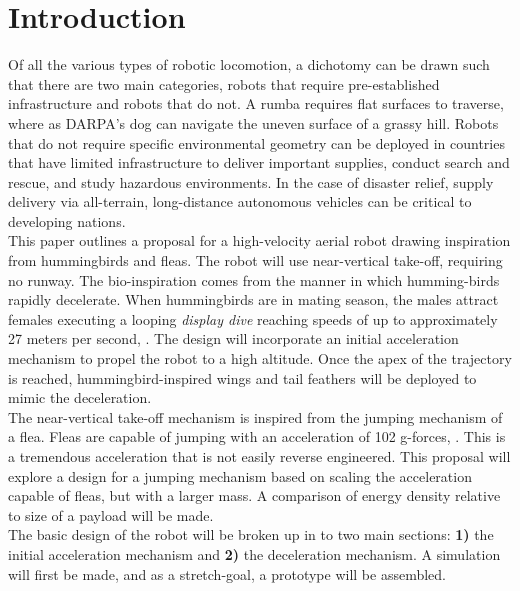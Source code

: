 \section{Introduction}
\label{intro}

\indent Of all the various types of robotic locomotion, a dichotomy can be drawn such that there are two main categories, robots that require pre-established infrastructure and robots that do not. A rumba requires flat surfaces to traverse, where as DARPA's dog can navigate the uneven surface of a grassy hill. Robots that do not require specific environmental geometry can be deployed in countries that have limited infrastructure to deliver important supplies, conduct search and rescue, and study hazardous environments. In the case of disaster relief, supply delivery via all-terrain, long-distance autonomous vehicles can be critical to developing nations.\\

\indent This paper outlines a proposal for a high-velocity aerial robot drawing
inspiration from hummingbirds and fleas. The robot will use near-vertical take-off, requiring no runway. The bio-inspiration comes from the manner in which humming-birds rapidly decelerate. When hummingbirds are in mating season, the males attract females executing a looping \textit{display dive} reaching speeds of up to approximately 27 meters per second, \cite{bennet-clark_jump_nodate}. The design will incorporate an initial acceleration mechanism to propel the robot to a high altitude. Once the apex of the trajectory is reached, hummingbird-inspired wings and tail feathers will be deployed to mimic the deceleration.\\

\indent The near-vertical take-off mechanism is inspired from the jumping mechanism of a flea. Fleas are capable of jumping with an acceleration of 102 g-forces, \cite[p.~62]{bennet-clark_jump_nodate}. This is a tremendous acceleration that is not easily reverse engineered. This proposal will explore a design for a jumping mechanism based on  scaling the acceleration capable of fleas, but with a larger mass. A comparison of energy density relative to size of a payload will be made.\\

\indent The basic design of the robot will be broken up in to two main sections: \textbf{1)} the initial acceleration mechanism and \textbf{2)} the deceleration mechanism. A simulation will first be made, and as a stretch-goal, a prototype will be assembled.\\